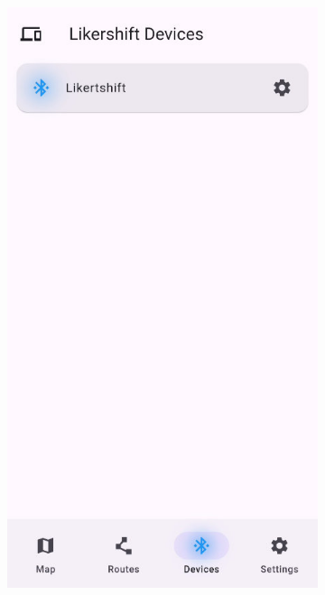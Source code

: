 \begin{figure}[!htb]
\begin{subfigure}{.25\textwidth}
        \includegraphics[width=.8666\linewidth]{images/app_devices_screen.jpg}
        \caption{\devicesscreen}
        \label{subfig:app_devices_screen}
    \end{subfigure}%
    \begin{subfigure}{.25\textwidth}
        \centering

\end{subfigure}
\end{figure}
